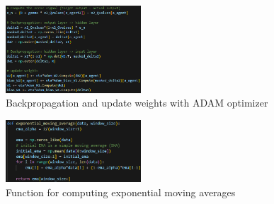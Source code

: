 \documentclass[conference]{IEEEtran}
\begin{document}
\begin{figure}[htbp]
\centerline{\includegraphics[width=0.45\textwidth]{images/backpropagation.png}}
\caption{Backpropagation and update weights with ADAM optimizer}
\label{fig:backpropagation}
\end{figure}

\begin{figure}[htbp]
\centerline{\includegraphics[width=0.45\textwidth]{images/ema.png}}
\caption{Function for computing exponential moving averages}
\label{fig:exponential_moving_average}
\end{figure}
\end{document}
